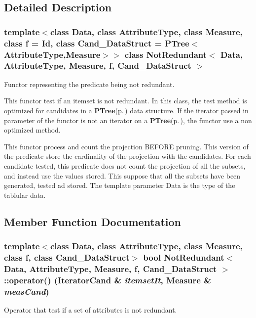 \subsection{Detailed Description}
\subsubsection*{template$<$class Data, class Attribute\-Type, class Measure, class f = Id, class Cand\_\-Data\-Struct = PTree$<$Attribute\-Type,Measure$>$$>$ class Not\-Redundant$<$ Data, Attribute\-Type, Measure, f, Cand\_\-Data\-Struct $>$}

Functor representing the predicate being not redundant. 

This functor test if an itemset is not redundant. In this class, the test method is optimized for candidates in a {\bf PTree}{\rm (p.\,\pageref{class_p_tree})} data structure. If the iterator passed in parameter of the functor is not an iterator on a {\bf PTree}{\rm (p.\,\pageref{class_p_tree})}, the functor use a non optimized method.

This functor process and count the projection BEFORE pruning. This version of the predicate store the cardinality of the projection with the candidates. For each candidate tested, this predicate does not count the projection of all the subsets, and instead use the values stored. This suppose that all the subsets have been generated, tested ad stored. The template parameter Data is the type of the tablular data. 



\subsection{Member Function Documentation}
\subsubsection{\setlength{\rightskip}{0pt plus 5cm}template$<$class Data, class Attribute\-Type, class Measure, class f, class Cand\_\-Data\-Struct$>$ bool {\bf Not\-Redundant}$<$ Data, Attribute\-Type, Measure, f, Cand\_\-Data\-Struct $>$::operator() ({\bf Iterator\-Cand} \& {\em itemset\-It}, Measure \& {\em meas\-Cand})}\label{class_not_redundant_11c7c4da4c46bbb5cd2546fc07801b32}


Operator that test if a set of attributes is not redundant. 

